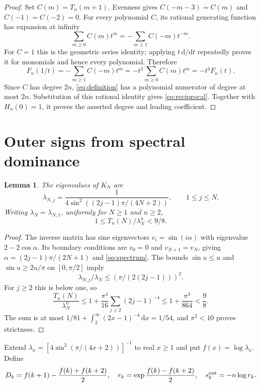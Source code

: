 \documentclass[11pt,letterpaper]{article}
\numberwithin{equation}{section}
\newtheorem{lemma}[theorem]{Lemma}
\newcommand{\dd}{\,\mathrm d}
\begin{document}
\begin{proof}
Set $C(m)=T_n(m+1)$. Evenness gives $C(-m-3)=C(m)$ and $C(-1)=C(-2)=0$. For every polynomial $C$, its rational generating function has expansion at infinity
\[
 \sum_{m\ge0}C(m)t^m=-\sum_{m\ge1}C(-m)t^{-m}.
\]
For $C=1$ this is the geometric series identity; applying $t\,\mathrm d/\mathrm dt$ repeatedly proves it for monomials and hence every polynomial. Therefore
\[
 F_n(1/t)=-\sum_{m\ge1}C(-m)t^m=-t^3\sum_{m\ge0}C(m)t^m=-t^3F_n(t).
\]
Since $C$ has degree $2n$, \eqref{eq:definition} has a polynomial numerator of degree at most $2n$. Substitution of this rational identity gives \eqref{eq:reciprocal}. Together with $H_n(0)=1$, it proves the asserted degree and leading coefficient.
\end{proof}

\section{Outer signs from spectral dominance}\label{sec:outer}
\begin{lemma}\label{lem:spectrum}
The eigenvalues of $K_N$ are
\begin{equation}\label{eq:spectrum}
 \lambda_{N,j}=\frac1{4\sin^2((2j-1)\pi/(4N+2))},\qquad 1\le j\le N.
\end{equation}
Writing $\lambda_N=\lambda_{N,1}$, uniformly for $N\ge1$ and $n\ge2$,
\begin{equation}\label{eq:trace-bound}1\le T_n(N)/\lambda_N^n<9/8.\end{equation}
\end{lemma}
\begin{proof}
The inverse matrix has sine eigenvectors $v_i=\sin(i\alpha)$ with eigenvalue $2-2\cos\alpha$. Its boundary conditions are $v_0=0$ and $v_{N+1}=v_N$, giving $\alpha=(2j-1)\pi/(2N+1)$ and \eqref{eq:spectrum}. The bounds $\sin u\le u$ and $\sin u\ge2u/\pi$ on $[0,\pi/2]$ imply
\[
 \lambda_{N,j}/\lambda_N\le(\pi/(2(2j-1)))^2.
\]
For $j\ge2$ this is below one, so
\[
 \frac{T_n(N)}{\lambda_N^n}
 \le1+\frac{\pi^4}{16}\sum_{j\ge2}(2j-1)^{-4}
 \le1+\frac{\pi^4}{864}<\frac98.
\]
The sum is at most $1/81+\int_2^\infty(2x-1)^{-4}\dd x=1/54$, and $\pi^2<10$ proves strictness.
\end{proof}
Extend $\lambda_x=[4\sin^2(\pi/(4x+2))]^{-1}$ to real $x\ge1$ and put $f(x)=\log\lambda_x$. Define
\begin{equation}\label{eq:outer-def}
 D_k=f(k+1)-\frac{f(k)+f(k+2)}2,\quad
 r_k=\exp\frac{f(k)-f(k+2)}2,\quad s_k^{\rm out}=-n\log r_k.
\end{equation}
\end{document}
